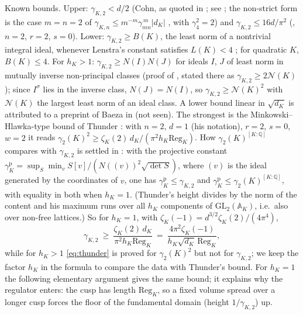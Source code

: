 \documentclass[11pt]{amsart}
\theoremstyle{definition}
\theoremstyle{remark}
\newcommand{\Q}{\mathbb{Q}}
\newcommand{\GL}{\mathrm{GL}}
\newcommand{\Reg}{\mathrm{Reg}_K}
\newcommand{\gK}{\gamma_{K,2}}
\begin{document}
Known bounds.  Upper: $\gK<d/2$ (Cohn, as quoted in \cite{PW05,PW09}; see
\cite{Cohn1,Cohn2}; the non-strict form is the case $m=n=2$ of
$\gamma_{K,n}\le m^{-m}\gamma_{mn}^{\,m}|d_K|$ \cite[Thm.~4.1, Rem.~4.2]{BI04}, with $\gamma_4^2=2$) and $\gK\le16d/\pi^2$ (\cite[Thm.~1]{Icaza}, $n=2$, $r=2$, $s=0$).  Lower:
$\gK\ge B(K)$, the least norm of a nontrivial integral ideal, whenever Lenstra's constant
satisfies $L(K)<4$ \cite[Prop.~4.1]{CIO}; for quadratic $K$, $B(K)\le4$.  For $h_K>1$:
$\gK\ge N(I)N(J)$ for ideals $I$, $J$ of least norm in mutually inverse non-principal classes
(proof of \cite[Cor.~3.2]{BI04}, stated there as $\gK\ge2\mathcal N(K)$); since $I^\sigma$ lies in the
inverse class, $N(J)=N(I)$, so $\gK\ge\mathcal N(K)^2$ with $\mathcal N(K)$ the largest least norm of
an ideal class.  A lower bound
linear in $\sqrt{d_K}$ is attributed to a preprint of Baeza in \cite[p.~21]{Icaza}
(not seen).  The strongest is the Minkowski--Hlawka-type bound of Thunder
\cite[Thm.~2]{Thunder}: with $n=2$, $d=1$ (his notation), $r=2$, $s=0$, $w=2$ it reads
$\gamma_2(K)^{2}\ge\zeta_K(2)\,d_K/(\pi^2h_K\Reg)$.  How $\gamma_2(K)^{[K:\Q]}$ compares with
$\gK$ is settled in \cite[\S5]{CIL}: with the projective constant
$\gamma^{\mathrm p}_{K}=\sup_S\min_v S[v]/(N((v))^2\sqrt{\det S})$, where $(v)$ is the ideal
generated by the coordinates of $v$, one has $\gamma^{\mathrm p}_K\le\gK$ and
$\gamma^{\mathrm p}_K\le\gamma_2(K)^{[K:\Q]}$, with equality in both when $h_K=1$.  (Thunder's
height divides by the norm of the content and his maximum runs over all $h_K$ components of
$\GL_2(\mathbb A_K)$, i.e.\ also over non-free lattices.)  So for $h_K=1$, with
$\zeta_K(-1)=d^{3/2}\zeta_K(2)/(4\pi^4)$,
\begin{equation}\label{eq:thunder}
\gK\ \ge\ \frac{\zeta_K(2)\,d_K}{\pi^2h_K\Reg}\ =\ \frac{4\pi^2\zeta_K(-1)}{h_K\sqrt{d_K}\,\Reg},
\end{equation}
while for $h_K>1$ \eqref{eq:thunder} is proved for $\gamma_2(K)^2$ but not for $\gK$; we keep
the factor $h_K$ in the formula to compare the data with Thunder's bound.  For $h_K=1$ the following elementary argument gives the same bound; it explains why the
regulator enters: the cusp has length $\Reg$, so a fixed volume spread over a longer cusp
forces the floor of the fundamental domain (height $1/\gK$) up.
\end{document}
